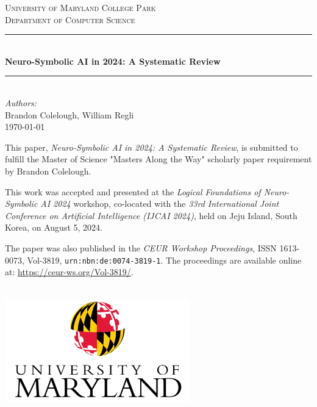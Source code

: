 \documentclass[a4paper]{article}
\begin{document}
\begin{titlepage}

\newcommand{\HRule}{\rule{\linewidth}{0.5mm}} 							%
\center 
 
\textsc{\LARGE University of Maryland College Park}\\[1cm]

\textsc{\Large Department of Computer Science}\\[0.2cm]					%
\HRule \\[0.8cm]
{ \huge \textbf{Neuro-Symbolic AI in 2024: A Systematic Review} \bfseries }\\[0.7cm]								%
\HRule \\[2cm]
\large
\emph{Authors:}\\
Brandon Colelough, William Regli\\[1.5cm]													%
{\large \today}\\[2.5cm]

\centering
\parbox{0.9\textwidth}{
This paper, \textit{Neuro-Symbolic AI in 2024: A Systematic Review}, is submitted to fulfill the Master of Science "Masters Along the Way" scholarly paper requirement by Brandon Colelough. 

This work was accepted and presented at the \textit{Logical Foundations of Neuro-Symbolic AI 2024} workshop, co-located with the \textit{33rd International Joint Conference on Artificial Intelligence (IJCAI 2024)}, held on Jeju Island, South Korea, on August 5, 2024. 

The paper was also published in the \textit{CEUR Workshop Proceedings}, ISSN 1613-0073, Vol-3819, \texttt{urn:nbn:de:0074-3819-1}. The proceedings are available online at: \url{https://ceur-ws.org/Vol-3819/}.
}\\[1.5cm]



\includegraphics[width=0.6\textwidth]{Figures/University-of-Maryland-Logo.png}\\[1cm] 	%
\vfill 
\end{titlepage}
\end{document}
